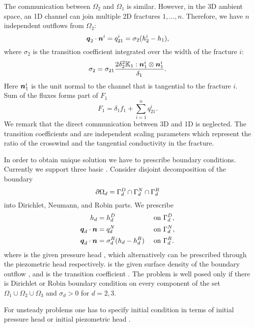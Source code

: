 The communication between $\Omega_2$  and  $\Omega_1$ is similar.  However, in the 3D ambient space,
an 1D channel can join multiple 2D fractures $1,\dots, n$. Therefore, we have $n$
independent outflows from $\Omega_2$:
\begin{equation*}
        \mathbf{\boldsymbol{q}}_2\cdot \mathbf{\boldsymbol{n}}^{i} = q_{21}^{i} =\sigma_{2} (h_2^{i}-h_1),
\end{equation*}
where $\sigma_2$  is the transition coefficient integrated over the width of the fracture $i$:
\[
\label{e:sigma2_law}
  \sigma_2 = \sigma_{21} \frac{2\delta_2^2\tn K_1:{\vc n_1^i}\otimes{\vc n_1^i}}{\delta_1}.
\]
Here $\mathbf{\boldsymbol{n}}_1^i$ is the unit normal to the channel that is tangential to the fracture $i$.
Sum of the fluxes forms part of $F_1$ 
\begin{equation}
   \label{source_1D}
   F_1 = \delta_1 f_1 + \sum_{i=1}^n q_{21}^{i}. 
\end{equation}
We remark that the direct communication between 3D and 1D is neglected.
The transition coefficients 
 \units{}{}{} and
 \units{}{}{} are independent scaling parameters which represent the ratio of the crosswind and the tangential conductivity in the fracture.

In order to obtain unique solution we have to prescribe boundary conditions. Currently we support three basic 
. 
Consider disjoint decomposition of the boundary
\[
    \partial\Omega_d = \Gamma_d^D \cap \Gamma_d^N \cap \Gamma_d^R
\]
into Dirichlet, Neumann, and Robin parts. We prescribe
\begin{align}
    h_d &= h_d^D        &&\text{ on }\Gamma_d^D,\\
    \mathbf{\boldsymbol{q}}_d \cdot \mathbf{\boldsymbol{n}} &= q_d^N         &&\text{ on }\Gamma_d^N,\\
    \mathbf{\boldsymbol{q}}_d \cdot \mathbf{\boldsymbol{n}} &= \sigma_d^R ( h_d - h_d^R)     &&\text{ on }\Gamma_d^R.
\end{align}
where 
is the given pressure head , which alternatively can be prescribed through the piezometric head 
respectively. 
is the given surface density of the boundary outflow , and  
is the transition coefficient .
The problem is well posed only if there is Dirichlet or Robin boundary condition on every component of the set $\Omega_1 \cup \Omega_2 \cup \Omega_3$ and $\sigma_d >0$ for 
$d=2,3$.

For unsteady problems one has to specify initial condition in terms of initial pressure head 
or initial piezometric head 
.




